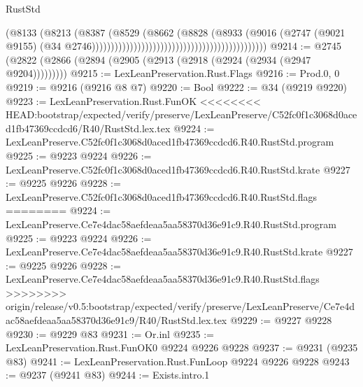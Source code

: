 \begin{lexlean}{RustStd}
\begin{coremodule}
{\begin{coremodule}
{{{{{{{{{{{{{{{{{{{{{{{{{{{{{{{{{                                                                            (@8133
                                                                              (@8213
                                                                                (@8387
                                                                                  (@8529
                                                                                    (@8662
                                                                                      (@8828
                                                                                        (@8933
                                                                                          (@9016
                                                                                            (@2747
                                                                                              (@9021
                                                                                                @9155)
                                                                                              (@34
                                                                                                @2746))))))))))))))))))))))))))))))))))))))))))))))
@9214 := @2745 (@2822 (@2866 (@2894 (@2905 (@2913 (@2918 (@2924 (@2934 (@2947 @9204)))))))))
@9215 := LexLeanPreservation.Rust.Flags
@9216 := Prod.{0, 0}
@9219 := @9216 (@9216 @8 @7)
@9220 := Bool
@9222 := @34 (@9219 @9220)
@9223 := LexLeanPreservation.Rust.FunOK
<<<<<<<< HEAD:bootstrap/expected/verify/preserve/LexLeanPreserve/C52fc0f1c3068d0aced1fb47369ccdcd6/R40/RustStd.lex.tex
@9224 := LexLeanPreserve.C52fc0f1c3068d0aced1fb47369ccdcd6.R40.RustStd.program
@9225 := @9223 @9224
@9226 := LexLeanPreserve.C52fc0f1c3068d0aced1fb47369ccdcd6.R40.RustStd.krate
@9227 := @9225 @9226
@9228 := LexLeanPreserve.C52fc0f1c3068d0aced1fb47369ccdcd6.R40.RustStd.flags
========
@9224 := LexLeanPreserve.Ce7e4dac58aefdeaa5aa58370d36e91c9.R40.RustStd.program
@9225 := @9223 @9224
@9226 := LexLeanPreserve.Ce7e4dac58aefdeaa5aa58370d36e91c9.R40.RustStd.krate
@9227 := @9225 @9226
@9228 := LexLeanPreserve.Ce7e4dac58aefdeaa5aa58370d36e91c9.R40.RustStd.flags
>>>>>>>> origin/release/v0.5:bootstrap/expected/verify/preserve/LexLeanPreserve/Ce7e4dac58aefdeaa5aa58370d36e91c9/R40/RustStd.lex.tex
@9229 := @9227 @9228
@9230 := @9229 @83
@9231 := Or.inl
@9235 := LexLeanPreservation.Rust.FunOK0 @9224 @9226 @9228
@9237 := @9231 (@9235 @83)
@9241 := LexLeanPreservation.Rust.FunLoop @9224 @9226 @9228
@9243 := @9237 (@9241 @83)
@9244 := Exists.intro.{1}
}}}}}}}}}}}}}}}}}}}}}}}}}}}}}}}}}
\end{coremodule}}
\end{coremodule}
\end{lexlean}
